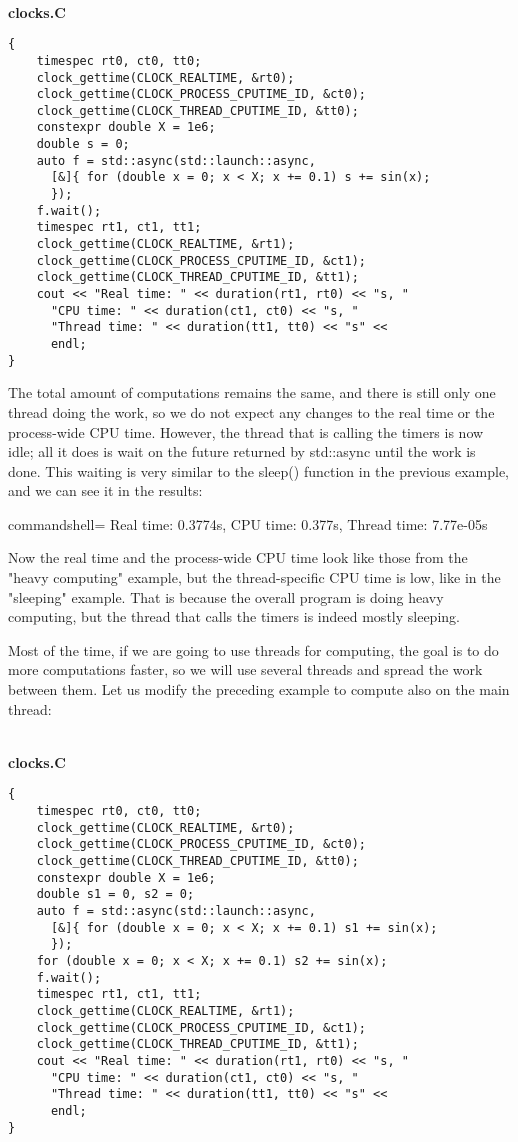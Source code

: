 \hspace*{\fill} \\ %
\noindent
\textbf{clocks.C}
\begin{lstlisting}[style=styleCXX]
{
	timespec rt0, ct0, tt0;
	clock_gettime(CLOCK_REALTIME, &rt0);
	clock_gettime(CLOCK_PROCESS_CPUTIME_ID, &ct0);
	clock_gettime(CLOCK_THREAD_CPUTIME_ID, &tt0);
	constexpr double X = 1e6;
	double s = 0;
	auto f = std::async(std::launch::async,
	  [&]{ for (double x = 0; x < X; x += 0.1) s += sin(x);
	  });
	f.wait();
	timespec rt1, ct1, tt1;
	clock_gettime(CLOCK_REALTIME, &rt1);
	clock_gettime(CLOCK_PROCESS_CPUTIME_ID, &ct1);
	clock_gettime(CLOCK_THREAD_CPUTIME_ID, &tt1);
	cout << "Real time: " << duration(rt1, rt0) << "s, "
	  "CPU time: " << duration(ct1, ct0) << "s, "
	  "Thread time: " << duration(tt1, tt0) << "s" <<
	  endl;
}
\end{lstlisting}

The total amount of computations remains the same, and there is still only one thread doing the work, so we do not expect any changes to the real time or the process-wide CPU time. However, the thread that is calling the timers is now idle; all it does is wait on the future returned by std::async until the work is done. This waiting is very similar to the sleep() function in the previous example, and we can see it in the results:

\begin{tcblisting}{commandshell={}}
Real time: 0.3774s, CPU time: 0.377s, Thread time: 7.77e-05s
\end{tcblisting}

Now the real time and the process-wide CPU time look like those from the "heavy computing" example, but the thread-specific CPU time is low, like in the "sleeping" example. That is because the overall program is doing heavy computing, but the thread that calls the timers is indeed mostly sleeping.

Most of the time, if we are going to use threads for computing, the goal is to do more computations faster, so we will use several threads and spread the work between them. Let us modify the preceding example to compute also on the main thread:

\hspace*{\fill} \\ %
\noindent
\textbf{clocks.C}
\begin{lstlisting}[style=styleCXX]
{
	timespec rt0, ct0, tt0;
	clock_gettime(CLOCK_REALTIME, &rt0);
	clock_gettime(CLOCK_PROCESS_CPUTIME_ID, &ct0);
	clock_gettime(CLOCK_THREAD_CPUTIME_ID, &tt0);
	constexpr double X = 1e6;
	double s1 = 0, s2 = 0;
	auto f = std::async(std::launch::async,
	  [&]{ for (double x = 0; x < X; x += 0.1) s1 += sin(x);
	  });
	for (double x = 0; x < X; x += 0.1) s2 += sin(x);
	f.wait();
	timespec rt1, ct1, tt1;
	clock_gettime(CLOCK_REALTIME, &rt1);
	clock_gettime(CLOCK_PROCESS_CPUTIME_ID, &ct1);
	clock_gettime(CLOCK_THREAD_CPUTIME_ID, &tt1);
	cout << "Real time: " << duration(rt1, rt0) << "s, "
	  "CPU time: " << duration(ct1, ct0) << "s, "
	  "Thread time: " << duration(tt1, tt0) << "s" <<
	  endl;
}
\end{lstlisting}

